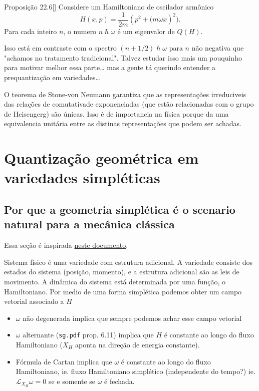 \begin{thing4}{Proposição 22.6}[\cite{hallq}]\leavevmode
	Considere um Hamiltoniano de oscilador armônico
	\[H(x,p)=\frac{1}{2m}(p^2+\Big(m \omega x)^2\Big).\]
	Para cada inteiro $n$, o numero $n\hslash \omega$ é um eigenvalor de $Q(H)$.
\end{thing4}
Isso está em contraste com o spectro $(n+1/2)\hslash \omega$ para $n$  não negativa que "achamos no tratamento tradicional". {\color{2}Talvez estudar isso mais um pouquinho para motivar melhor essa parte… mas a gente tá querindo entender a prequantização em variedades…}

\begin{remark}\leavevmode
	O teorema de Stone-von Neumann garantiza que as representações irreduciveis das relações de comutativade exponenciadas (que estão relacionadas com o grupo de Heisengerg) são únicas. Isso é de importancia na física porque da uma equivalencia unitária entre as distinas representações que podem ser achadas.
\end{remark}


\section{Quantização geométrica em variedades simpléticas}

\subsection{Por que a geometria simplética é o scenario natural para a mecânica clássica}

Essa seção é inspirada \href{https://cohn.mit.edu/symplectic/}{neste documento}.

Sistema f\'isico \'e uma variedade com estrutura adicional. A variedade consiste dos estados do sistema (posi\c c\~ao, momento), e a estrutura adicional s\~ao as leis de movimento. A din\^amica do sistema est\'a determinada por uma fun\c c\~ao, o Hamiltoniano. Por medio de uma forma simpl\'etica podemos obter um campo vetorial associado a $H$ 

\begin{itemize}
\item $\omega$ n\~ao degenerada implica que sempre podemos achar esse campo vetorial

\item  $\omega$ alternante (\texttt{sg.pdf} prop. 6.11) implica que $H$ \'e constante ao longo do fluxo Hamiltoniano ($X_H$ aponta na  dire\c c\~ao de energia constante).

\item F\'ormula de Cartan implica que $\omega$  \'e constante ao longo do fluxo Hamiltoniano, ie. fluxo Hamiltoniano simpl\'etico (independente do tempo?) ie. $\mathcal{L}_{X_H}\omega=0$ se e somente se $\omega$ \'e fechada.
\end{itemize}

